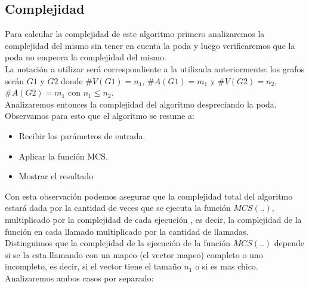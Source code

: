 \subsection{Complejidad}
Para calcular la complejidad de este algoritmo primero analizaremos la complejidad del mismo sin tener en cuenta la poda y luego verificaremos que la poda no empeora la complejidad del mismo.\\
La notación a utilizar será correspondiente a la utilizada anteriormente: los grafos serán $G1$ y $G2$ donde 
$\# V(G1) = n_1$, 
$\# A(G1) = m_1$ y 
$\# V(G2) = n_2$, 
$ \# A(G2) = m_1$ 
con $n_1 \leq n_2$.\\
Analizaremos entonces la complejidad del algoritmo despreciando la poda. Observamos para esto que el algoritmo se resume a: 
\begin{itemize}
	\item Recibir los parámetros de entrada.
	\item Aplicar la función MCS.
    \item Mostrar el resultado%
\end{itemize}

Con esta observación podemos asegurar que la complejidad total del algoritmo estará dada por la cantidad de veces que se ejecuta la función $MCS(..)$, multiplicado por la complejidad de cada ejecución , es decir, la complejidad de la función en cada llamado multiplicado por la cantidad de llamadas.\\
Distinguimos que la complejidad de la ejecución de la función $MCS(..)$ depende si se la esta llamando con un mapeo (el vector mapeo) completo o uno incompleto, es decir, si el vector tiene el tamaño $n_1$ o si es mas chico. Analizaremos ambos casos por separado:

